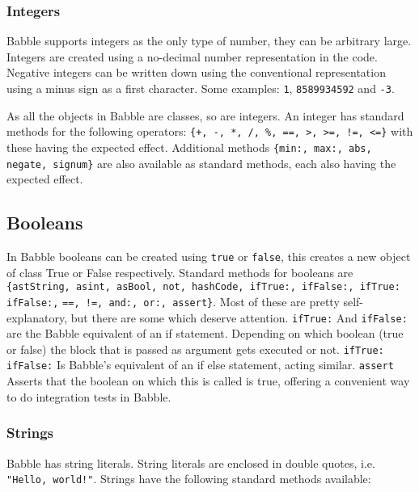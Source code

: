 \documentclass[a4paper]{article}
\begin{document}


\subsubsection{Integers}

Babble supports integers as the only type of number, they can be arbitrary large. Integers are created using a no-decimal number representation in the code. Negative integers can be written down using the conventional representation using a minus sign as a first character. Some examples:
\verb|1|, \verb|8589934592| and \verb|-3|.

As all the objects in Babble are classes, so are integers. An integer has standard methods for the following operators: \verb|{+, -, *, /, %, ==, >, >=, !=, <=}| with these having the expected effect. Additional methods \verb|{min:, max:, abs, negate, signum}| are also available as standard methods, each also having the expected effect.

\subsection{Booleans}
In Babble booleans can be created using \verb|true| or  \verb|false|, this creates a new object of class True or False respectively. Standard methods for booleans are
\verb|{astString, asint, asBool, not, hashCode, ifTrue:, ifFalse:, ifTrue: ifFalse:,|
\verb|==, !=, and:, or:, assert}|. Most of these are pretty self-explanatory, but there are some which deserve attention. \verb|ifTrue:| And \verb|ifFalse:| are the Babble equivalent of an if statement. Depending on which boolean (true or false) the block that is passed as argument gets executed or not. \verb|ifTrue: ifFalse:| Is Babble's equivalent of an if else statement, acting similar. \verb|assert| Asserts that the boolean on which this is called is true, offering a convenient way to do integration tests in Babble.


\subsubsection{Strings}

Babble has string literals. String literals are enclosed in double quotes, i.e. \verb|"Hello, world!"|. Strings have the following standard methods available:
\end{document}
